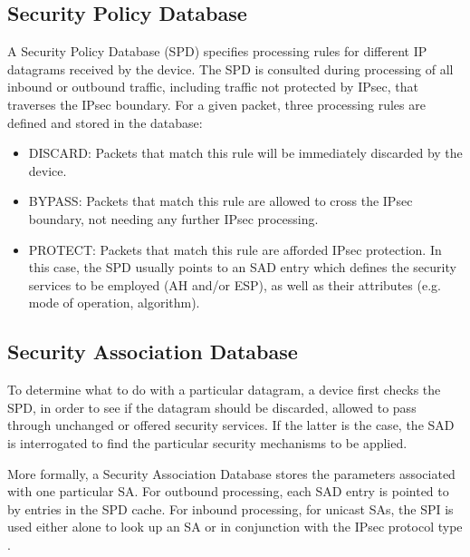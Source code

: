 \documentclass[a4paper,12pt]{report}
\begin{document}
	\subsection{Security Policy Database}
		A Security Policy Database (SPD) specifies processing rules for different IP datagrams received by the device. The SPD is consulted during processing of all inbound or outbound traffic, including traffic not protected by IPsec, that traverses the IPsec boundary. For a given packet, three processing rules are defined and stored in the database:
		\begin{itemize}
			\item DISCARD: Packets that match this rule will be immediately discarded by the device.
			\item BYPASS: Packets that match this rule are allowed to cross the IPsec boundary, not needing any further IPsec processing.
			\item PROTECT: Packets that match this rule are afforded IPsec protection. In this case, the SPD usually points to an SAD entry which defines the security services to be employed (AH and/or ESP), as well as their attributes (e.g. mode of operation, algorithm).
		\end{itemize}
		
	\subsection{Security Association Database}
		To determine what to do with a particular datagram, a device first checks the SPD, in order to see if the datagram should be discarded, allowed to pass through unchanged or offered security services. If the latter is the case, the SAD is interrogated to find the particular security mechanisms to be applied.
		
		More formally, a Security Association Database stores the parameters associated
with one particular SA. For outbound processing, each SAD entry is pointed to by entries in the SPD cache.  For inbound processing, for unicast SAs, the SPI is used either alone to look up an SA or in conjunction with the IPsec protocol type \cite{rfc4301}.
\end{document}
